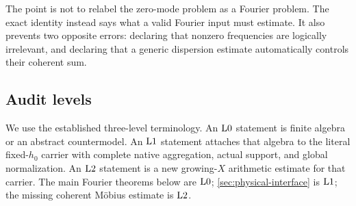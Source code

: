The point is not to relabel the zero-mode problem as a Fourier
problem.  The exact identity instead says what a valid Fourier input
must estimate.  It also prevents two opposite errors: declaring that
nonzero frequencies are logically irrelevant, and declaring that a
generic dispersion estimate automatically controls their coherent
sum.

\subsection{Audit levels}

We use the established three-level terminology.  An \(\mathrm{L0}\)
statement is finite algebra or an abstract countermodel.  An
\(\mathrm{L1}\) statement attaches that algebra to the literal
fixed-\(h_0\) carrier with complete native aggregation, actual support,
and global normalization.  An \(\mathrm{L2}\) statement is a new
growing-\(X\) arithmetic estimate for that carrier.  The main Fourier
theorems below are \(\mathrm{L0}\); \cref{sec:physical-interface} is
\(\mathrm{L1}\); the missing coherent M\"obius estimate is \(\mathrm{L2}\).
